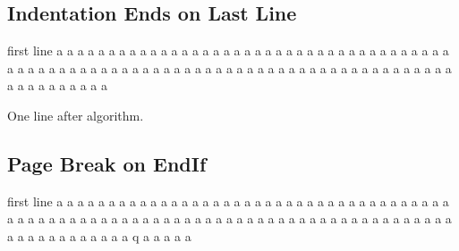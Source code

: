 \documentclass[a4paper]{article}
\begin{document}
	\newpage
	\subsection{Indentation Ends on Last Line}
	\begin{algorithmic}[1]
		\State first line
			\State a
			\State a
			\State a
			\State a
			\State a
			\State a
			\State a
			\State a
			\State a
			\State a
			\State a
			\State a
			\State a
			\State a
			\State a
			\State a
			\State a
			\State a
			\State a
			\State a
			\State a
			\State a
			\State a
			\State a
			\State a
			\State a
			\State a
			\State a
			\State a
			\State a
			\State a
			\State a
			\State a
			\State a
			\State a
			\State a
			\State a
			\State a
			\State a
			\State a
			\State a
			\State a
			\State a
			\State a
			\State a
			\State a
			\State a
			\State a
			\State a
			\State a
			\State a
			\State a
			\State a
			\State a
			\State a
			\State a
			\State a
			\State a
			\State a
			\State a
			\State a
			\State a
			\State a
			\State a
			\State a
			\State a
			\State a
			\State a
			\State a
			\State a
			\State a
				\State a
				\State a
				\State a
				\State a
				\State a
				\State a
				\State a
				\State a
				\State a
				\State a
				\State a
				\State a
				\State a
				\State a
				\State a
					\State a
					\State a
					\State a
					\State a
					\State a
				\EndIf
			\EndIf
		\EndIf
	\end{algorithmic}
	One line after algorithm.

	\newpage
	\subsection{Page Break on EndIf}
	\begin{algorithmic}[1]
		\State first line
			\State a
			\State a
			\State a
			\State a
			\State a
			\State a
			\State a
			\State a
			\State a
			\State a
			\State a
			\State a
			\State a
			\State a
			\State a
			\State a
			\State a
			\State a
			\State a
			\State a
			\State a
			\State a
			\State a
			\State a
			\State a
			\State a
			\State a
			\State a
			\State a
			\State a
			\State a
			\State a
			\State a
			\State a
			\State a
			\State a
			\State a
			\State a
			\State a
			\State a
			\State a
			\State a
			\State a
			\State a
			\State a
			\State a
			\State a
			\State a
			\State a
			\State a
			\State a
			\State a
			\State a
			\State a
			\State a
			\State a
			\State a
			\State a
			\State a
			\State a
			\State a
			\State a
			\State a
			\State a
			\State a
			\State a
			\State a
			\State a
			\State a
			\State a
			\State a
			\State a
			\State a
			\State a
			\State a
			\State a
			\State a
			\State a
			\State a
			\State a
			\State a
				\State a
				\State a
				\State a
				\State a
				\State a
				\State a
				\State a
				\State a
				\State a
				\State a
				\State a
				\State a
				\State q
			\EndIf
			\State a
			\State a
			\State a
			\State a
			\State a
		\EndIf
    \end{algorithmic}
\end{document}
